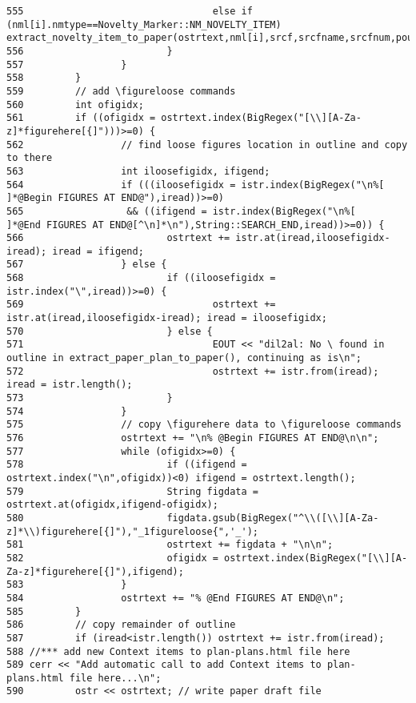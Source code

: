 \begin{verbatim}
555                                 else if (nml[i].nmtype==Novelty_Marker::NM_NOVELTY_ITEM) extract_novelty_item_to_paper(ostrtext,nml[i],srcf,srcfname,srcfnum,poutline,pprevtext);
556                         }
557                 }
558         }
559         // add \figureloose commands
560         int ofigidx;
561         if ((ofigidx = ostrtext.index(BigRegex("[\\][A-Za-z]*figurehere[{]")))>=0) {
562                 // find loose figures location in outline and copy to there
563                 int iloosefigidx, ifigend;
564                 if (((iloosefigidx = istr.index(BigRegex("\n%[  ]*@Begin FIGURES AT END@"),iread))>=0)
565                  && ((ifigend = istr.index(BigRegex("\n%[       ]*@End FIGURES AT END@[^\n]*\n"),String::SEARCH_END,iread))>=0)) {
566                         ostrtext += istr.at(iread,iloosefigidx-iread); iread = ifigend;
567                 } else {
568                         if ((iloosefigidx = istr.index("\",iread))>=0) {
569                                 ostrtext += istr.at(iread,iloosefigidx-iread); iread = iloosefigidx;
570                         } else {
571                                 EOUT << "dil2al: No \ found in outline in extract_paper_plan_to_paper(), continuing as is\n";
572                                 ostrtext += istr.from(iread); iread = istr.length();
573                         }
574                 }
575                 // copy \figurehere data to \figureloose commands
576                 ostrtext += "\n% @Begin FIGURES AT END@\n\n";
577                 while (ofigidx>=0) {
578                         if ((ifigend = ostrtext.index("\n",ofigidx))<0) ifigend = ostrtext.length();
579                         String figdata = ostrtext.at(ofigidx,ifigend-ofigidx);
580                         figdata.gsub(BigRegex("^\\([\\][A-Za-z]*\\)figurehere[{]"),"_1figureloose{",'_');
581                         ostrtext += figdata + "\n\n";
582                         ofigidx = ostrtext.index(BigRegex("[\\][A-Za-z]*figurehere[{]"),ifigend);
583                 }
584                 ostrtext += "% @End FIGURES AT END@\n";
585         }
586         // copy remainder of outline
587         if (iread<istr.length()) ostrtext += istr.from(iread);
588 //*** add new Context items to plan-plans.html file here
589 cerr << "Add automatic call to add Context items to plan-plans.html file here...\n";
590         ostr << ostrtext; // write paper draft file

\end{verbatim}
